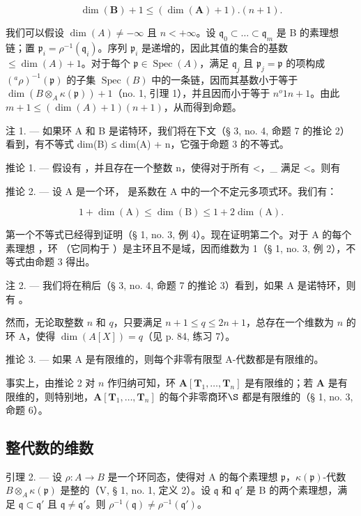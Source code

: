 \[
\dim (\mathbf {B}) + 1 \leqslant (\dim (\mathbf {A}) + 1). (n + 1).
\]

我们可以假设 \(\dim(A) \neq -\infty\) 且 \(n < +\infty\)。设 \(\mathfrak{q}_0 \subset \ldots \subset \mathfrak{q}_m\) 是 B 的素理想链；置 \(\mathfrak{p}_i = \rho^{-1}(\mathfrak{q}_i)\)。序列 \(\mathfrak{p}_i\) 是递增的，因此其值的集合的基数 \(\leqslant \dim(A) + 1\)。对于每个 \(\mathfrak{p} \in \operatorname{Spec}(A)\)，满足 \(\mathfrak{q}_j\) 且 \(\mathfrak{p}_j = \mathfrak{p}\) 的项构成 \(({}^{a}\rho)^{-1}(\mathfrak{p})\) 的子集 \(\operatorname{Spec}(B)\) 中的一条链，因而其基数小于等于 \(\dim(B \otimes_A \kappa(\mathfrak{p})) + 1\)（no. 1, 引理 1），并且因而小于等于 \(n^o 1\)\(n + 1\)。由此 \(m + 1 \leqslant (\dim(A) + 1)(n + 1)\)，从而得到命题。

注 1. --- 如果环 A 和 B 是诺特环，我们将在下文（§ 3, no. 4, 命题 7 的推论 2）看到，有不等式 dim(B) ≤ dim(A) + n，它强于命题 3 的不等式。

推论 1. --- 假设有  ，并且存在一个整数 n，使得对于所有 \textless{}，\_ 满足 \textless{}。则有

推论 2. --- 设 A 是一个环，{}{} 是系数在 A 中的一个不定元多项式环。我们有：

\[
1 + \dim (\mathrm{A}) \leqslant \dim (\mathrm{B}) \leqslant 1 + 2 \dim (\mathrm{A}).
\]

第一个不等式已经得到证明（§ 1, no. 3, 例 4）。现在证明第二个。对于 A 的每个素理想  ，环 {（它同构于 }{}）是主环且不是域，因而维数为 1（§ 1, no. 3, 例 2），不等式由命题 3 得出。

注 2. --- 我们将在稍后（§ 3, no. 4, 命题 7 的推论 3）看到，如果 A 是诺特环，则有 {}{}。

然而，无论取整数 \(n\) 和 \(q\)，只要满足 \(n + 1 \leqslant q \leqslant 2n + 1\)，总存在一个维数为 \(n\) 的环 A，使得 \(\dim(A[X]) = q\)（见 p. 84, 练习 7）。

推论 3. --- 如果 A 是有限维的，则每个非零有限型 A-代数都是有限维的。

事实上，由推论 2 对 \(n\) 作归纳可知，环 \(\mathbf{A}[\mathbf{T}_{1}, \ldots, \mathbf{T}_{n}]\) 是有限维的；若 \(\mathbf{A}\) 是有限维的，则特别地，\(\mathbf{A}[\mathbf{T}_{1}, \ldots, \mathbf{T}_{n}]\) 的每个非零商环\(\S\) 都是有限维的（§ 1, no. 3, 命题 6）。

\subsection{整代数的维数}

引理 2. --- 设 \(\rho: A \to B\) 是一个环同态，使得对 A 的每个素理想 \(\mathfrak{p}\)，\(\kappa(\mathfrak{p})\)-代数 \(B \otimes_{A} \kappa(\mathfrak{p})\) 是整的（V, § 1, no. 1, 定义 2）。设 \(\mathfrak{q}\) 和 \(\mathfrak{q}'\) 是 B 的两个素理想，满足 \(\mathfrak{q} \subset \mathfrak{q}'\) 且 \(\mathfrak{q} \neq \mathfrak{q}'\)。则 \(\rho^{-1}(\mathfrak{q}) \neq \rho^{-1}(\mathfrak{q}')\)。

